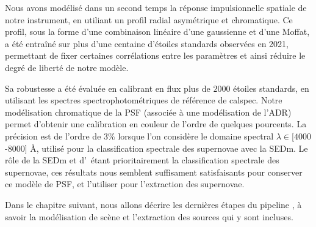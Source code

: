 \documentclass[../main/main.tex]{subfiles}
\begin{document}
Nous avons modélisé dans un second temps la réponse impulsionnelle
spatiale de notre instrument, en utiliant un profil radial asymétrique et chromatique. Ce
profil, sous la forme d'une combinaison linéaire d'une gaussienne et
d'une Moffat, a été entraîné sur plus d'une centaine d'étoiles standards observées en 2021,
permettant de fixer certaines corrélations entre les paramètres et ainsi
réduire le degré de liberté de notre modèle.

Sa robustesse a été évaluée en calibrant en flux plus de $2000$ étoiles
standards, en utilisant les spectres spectrophotométriques de référence
de calspec. Notre modélisation chromatique de la PSF (associée à une
modélisation de l'ADR) permet d'obtenir une
calibration en couleur de l'ordre de quelques pourcents. La précision
est de l'ordre de $3\%$
lorsque l'on considère le domaine spectral $\lambda\in$[$4000$-$8000$]
\AA, utilisé pour la classification spectrale des supernovae avec la SEDm.
Le rôle de la SEDm et d'\hypergal\ étant prioritairement la classification spectrale des
supernovae, ces résultats nous semblent suffisament satisfaisants pour
conserver ce modèle de PSF, et l'utiliser pour l'extraction
des supernovae.

Dans le chapitre suivant, nous allons décrire les dernières étapes du
pipeline \hypergal, à savoir la modélisation de scène et l'extraction
des sources qui y sont incluses.
%
%
\end{document}
